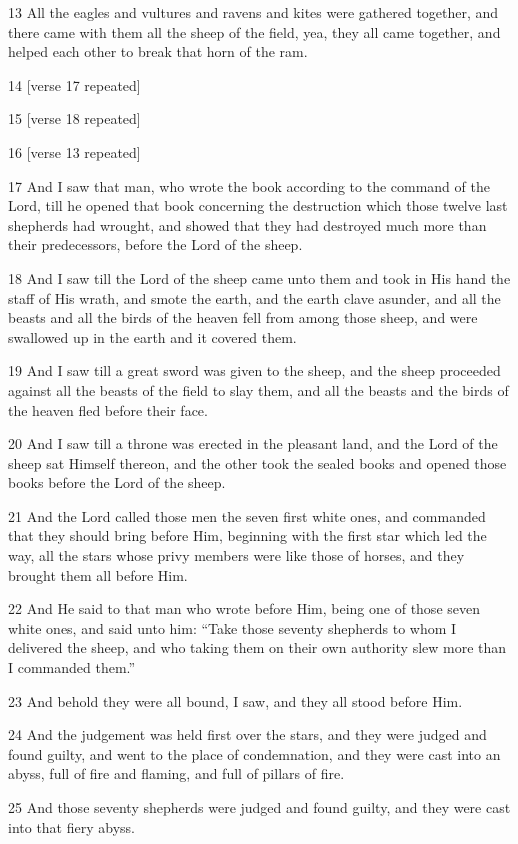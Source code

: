 \par 13 All the eagles and vultures and ravens and kites were gathered together, and there came with them all the sheep of the field, yea, they all came together, and helped each other to break that horn of the ram.
\par 14 [verse 17 repeated]
\par 15 [verse 18 repeated]
\par 16 [verse 13 repeated]
\par 17 And I saw that man, who wrote the book according to the command of the Lord, till he opened that book concerning the destruction which those twelve last shepherds had wrought, and showed that they had destroyed much more than their predecessors, before the Lord of the sheep.
\par 18 And I saw till the Lord of the sheep came unto them and took in His hand the staff of His wrath, and smote the earth, and the earth clave asunder, and all the beasts and all the birds of the heaven fell from among those sheep, and were swallowed up in the earth and it covered them.
\par 19 And I saw till a great sword was given to the sheep, and the sheep proceeded against all the beasts of the field to slay them, and all the beasts and the birds of the heaven fled before their face.
\par 20 And I saw till a throne was erected in the pleasant land, and the Lord of the sheep sat Himself thereon, and the other took the sealed books and opened those books before the Lord of the sheep.
\par 21 And the Lord called those men the seven first white ones, and commanded that they should bring before Him, beginning with the first star which led the way, all the stars whose privy members were like those of horses, and they brought them all before Him.
\par 22 And He said to that man who wrote before Him, being one of those seven white ones, and said unto him: “Take those seventy shepherds to whom I delivered the sheep, and who taking them on their own authority slew more than I commanded them.”
\par 23 And behold they were all bound, I saw, and they all stood before Him.
\par 24 And the judgement was held first over the stars, and they were judged and found guilty, and went to the place of condemnation, and they were cast into an abyss, full of fire and flaming, and full of pillars of fire.
\par 25 And those seventy shepherds were judged and found guilty, and they were cast into that fiery abyss.
